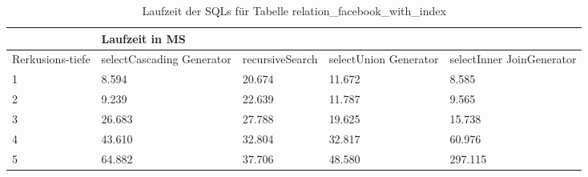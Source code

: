 \begin{table}[H]
	\centering
	\begin{tabular}{l|l|l|l|l|l|}
		\cline{2-6}
		& \multicolumn{5}{|l|}{Laufzeit in MS}                                                                                                                                                  \\ \hline
		\multicolumn{1}{|l|}{\multirow{2}{2cm}{Rerkusions-tiefe}} & \multicolumn{2}{|l|}{\multirow{2}{3cm}{selectCascading Generator}} & \multirow{2}{2.8cm}{recursiveSearch} & \multirow{2}{2.5cm}{selectUnion Generator} & \multirow{2}{2.5cm}{selectInner JoinGenerator} \\
		\multicolumn{1}{|l|}{}
		& \multicolumn{2}{|l|}{}                                           &                                  &                                     &                                           \\ \hline
		
		\multicolumn{1}{|l|}{1}                                 & \multicolumn{2}{l|}{8.594}                                       & 20.674                                                & 11.672                                                    & 8.585                                                           \\ \hline
		\multicolumn{1}{|l|}{2}                                 & \multicolumn{2}{l|}{9.239}                                       & 22.639                                                & 11.787                                                    & 9.565                                                           \\ \hline
		\multicolumn{1}{|l|}{3}                                 & \multicolumn{2}{l|}{26.683}                                      & 27.788                                                & 19.625                                                    & 15.738                                                          \\ \hline
		\multicolumn{1}{|l|}{4}                                 & \multicolumn{2}{l|}{43.610}                                      & 32.804                                                & 32.817                                                    & 60.976                                                              \\ \hline
		\multicolumn{1}{|l|}{5}                                 & \multicolumn{2}{l|}{64.882}                                      & 37.706                                                & 48.580                                                    & 297.115                                                         \\ \hline
	\end{tabular}
	\caption{Laufzeit der SQLs für Tabelle relation\_facebook\_with\_index}
	\label{2.relationfacebookindex.table}
\end{table}

